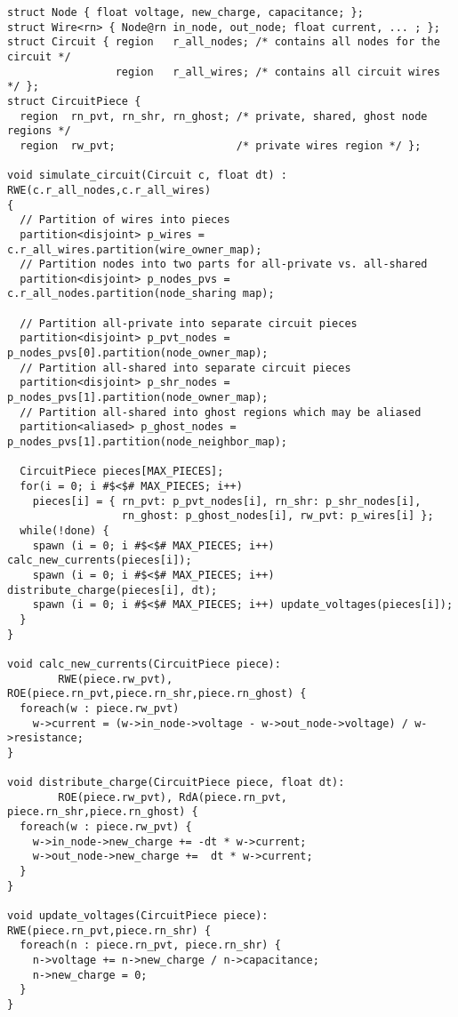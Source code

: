 \begin{lstlisting}[float={t},label={lst:code_ex},caption={Circuit Simulation Code Example}]
struct Node { float voltage, new_charge, capacitance; };
struct Wire<rn> { Node@rn in_node, out_node; float current, ... ; };
struct Circuit { region   r_all_nodes; /* contains all nodes for the circuit */
                 region   r_all_wires; /* contains all circuit wires */ };
struct CircuitPiece {
  region  rn_pvt, rn_shr, rn_ghost; /* private, shared, ghost node regions */
  region  rw_pvt;                   /* private wires region */ };

void simulate_circuit(Circuit c, float dt) : RWE(c.r_all_nodes,c.r_all_wires)
{
  // Partition of wires into pieces
  partition<disjoint> p_wires = c.r_all_wires.partition(wire_owner_map); 
  // Partition nodes into two parts for all-private vs. all-shared
  partition<disjoint> p_nodes_pvs = c.r_all_nodes.partition(node_sharing map);

  // Partition all-private into separate circuit pieces
  partition<disjoint> p_pvt_nodes = p_nodes_pvs[0].partition(node_owner_map);
  // Partition all-shared into separate circuit pieces
  partition<disjoint> p_shr_nodes = p_nodes_pvs[1].partition(node_owner_map);
  // Partition all-shared into ghost regions which may be aliased
  partition<aliased> p_ghost_nodes = p_nodes_pvs[1].partition(node_neighbor_map);

  CircuitPiece pieces[MAX_PIECES];
  for(i = 0; i #$<$# MAX_PIECES; i++) 
    pieces[i] = { rn_pvt: p_pvt_nodes[i], rn_shr: p_shr_nodes[i],
                  rn_ghost: p_ghost_nodes[i], rw_pvt: p_wires[i] };
  while(!done) {
    spawn (i = 0; i #$<$# MAX_PIECES; i++) calc_new_currents(pieces[i]);
    spawn (i = 0; i #$<$# MAX_PIECES; i++) distribute_charge(pieces[i], dt);
    spawn (i = 0; i #$<$# MAX_PIECES; i++) update_voltages(pieces[i]);
  }
}

void calc_new_currents(CircuitPiece piece):
        RWE(piece.rw_pvt), ROE(piece.rn_pvt,piece.rn_shr,piece.rn_ghost) {
  foreach(w : piece.rw_pvt)
    w->current = (w->in_node->voltage - w->out_node->voltage) / w->resistance;
}

void distribute_charge(CircuitPiece piece, float dt):
        ROE(piece.rw_pvt), RdA(piece.rn_pvt, piece.rn_shr,piece.rn_ghost) {
  foreach(w : piece.rw_pvt) {
    w->in_node->new_charge += -dt * w->current;
    w->out_node->new_charge +=  dt * w->current;
  }
}

void update_voltages(CircuitPiece piece): RWE(piece.rn_pvt,piece.rn_shr) {
  foreach(n : piece.rn_pvt, piece.rn_shr) {
    n->voltage += n->new_charge / n->capacitance;
    n->new_charge = 0;
  }
}
\end{lstlisting}
